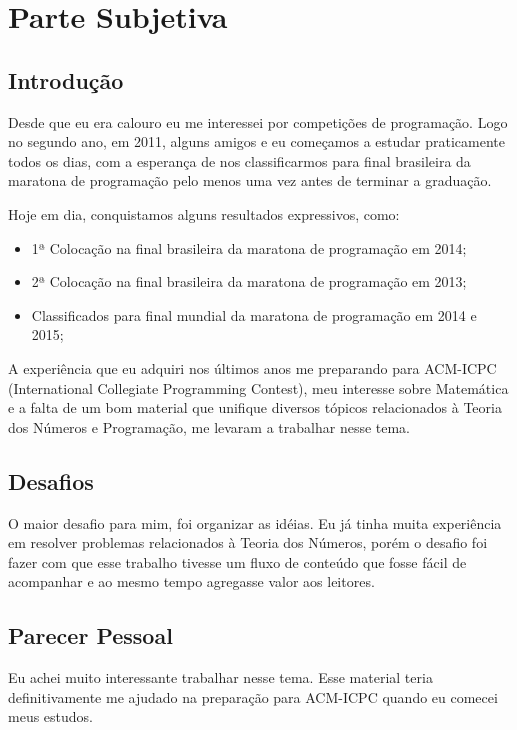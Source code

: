 \documentclass[
11pt, %
brazilian, %
singlespacing, %
]{MastersDoctoralThesis} %
\begin{document}
\newpage

\chapter*{Parte Subjetiva}
\thispagestyle{empty}

\section {Introdução}

Desde que eu era calouro eu me interessei por competições de programação. Logo no segundo ano, em 2011, alguns amigos e eu começamos a estudar praticamente todos os dias, com a esperança de nos classificarmos para final brasileira da maratona de programação pelo menos uma vez antes de terminar a graduação.

Hoje em dia, conquistamos alguns resultados expressivos, como:

\begin{itemize}
\item 1ª Colocação na final brasileira da maratona de programação em 2014;
\item 2ª Colocação na final brasileira da maratona de programação em 2013;
\item Classificados para final mundial da maratona de programação em 2014 e 2015;
\end{itemize}

A experiência que eu adquiri nos últimos anos me preparando para ACM-ICPC (International Collegiate Programming Contest), meu interesse sobre Matemática e a falta de um bom material que unifique diversos tópicos relacionados à Teoria dos Números e Programação, me levaram a trabalhar nesse tema.



\section {Desafios}
O maior desafio para mim, foi organizar as idéias.
Eu já tinha muita experiência em resolver problemas relacionados à Teoria dos Números, porém o desafio foi fazer com que esse trabalho tivesse um fluxo de conteúdo que fosse fácil de acompanhar e ao mesmo tempo agregasse valor aos leitores.



\section {Parecer Pessoal}
Eu achei muito interessante trabalhar nesse tema. Esse material teria definitivamente me ajudado na preparação para ACM-ICPC quando eu comecei meus estudos.
\end{document}
